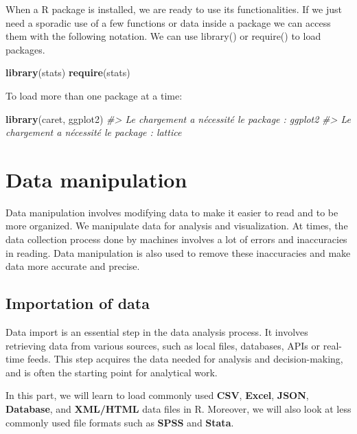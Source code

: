 \documentclass[
]{book}
\newenvironment{Shaded}{\begin{snugshade}}{\end{snugshade}}
\newcommand{\CommentTok}[1]{\textcolor[rgb]{0.56,0.35,0.01}{\textit{#1}}}
\newcommand{\FunctionTok}[1]{\textcolor[rgb]{0.13,0.29,0.53}{\textbf{#1}}}
\newcommand{\NormalTok}[1]{#1}
\begin{document}
When a R package is installed, we are ready to use its functionalities. If we just need a sporadic use of a few functions or data inside a package we can access them with the following notation.
We can use library() or require() to load packages.

\begin{Shaded}
\begin{Highlighting}[]
\FunctionTok{library}\NormalTok{(stats)}
\FunctionTok{require}\NormalTok{(stats)}
\end{Highlighting}
\end{Shaded}

To load more than one package at a time:

\begin{Shaded}
\begin{Highlighting}[]
\FunctionTok{library}\NormalTok{(caret, ggplot2)}
\CommentTok{\#\textgreater{} Le chargement a nécessité le package : ggplot2}
\CommentTok{\#\textgreater{} Le chargement a nécessité le package : lattice}
\end{Highlighting}
\end{Shaded}

\hypertarget{data-manipulation}{%
\chapter{Data manipulation}\label{data-manipulation}}

Data manipulation involves modifying data to make it easier to read and to be more organized. We manipulate data for analysis and visualization. At times, the data collection process done by machines involves a lot of errors and inaccuracies in reading. Data manipulation is also used to remove these inaccuracies and make data more accurate and precise.

\hypertarget{importation-of-data}{%
\section{Importation of data}\label{importation-of-data}}

Data import is an essential step in the data analysis process. It involves retrieving data from various sources, such as local files, databases, APIs or real-time feeds. This step acquires the data needed for analysis and decision-making, and is often the starting point for analytical work.

In this part, we will learn to load commonly used \textbf{CSV}, \textbf{Excel}, \textbf{JSON}, \textbf{Database}, and \textbf{XML/HTML} data files in R. Moreover, we will also look at less commonly used file formats such as \textbf{SPSS} and \textbf{Stata}.
\end{document}
